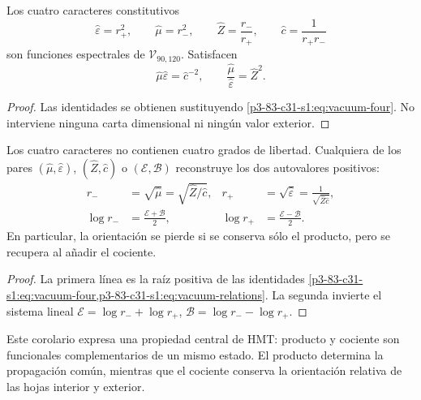 \begin{theorem}
Los cuatro caracteres constitutivos
\begin{equation}
\widehat\varepsilon=r_+^2,\qquad
\widehat\mu=r_-^2,\qquad
\widehat Z=\frac{r_-}{r_+},\qquad
\widehat c=\frac1{r_+r_-}
\label{p3-83-c31-s1:eq:vacuum-four}
\end{equation}
son funciones espectrales de \(\mathcal V_{90,120}\). Satisfacen
\begin{equation}
\widehat\mu\widehat\varepsilon=\widehat c^{-2},
\qquad
\frac{\widehat\mu}{\widehat\varepsilon}=\widehat Z^2.
\label{p3-83-c31-s1:eq:vacuum-relations}
\end{equation}
\end{theorem}

\begin{proof}
Las identidades se obtienen sustituyendo \cref{p3-83-c31-s1:eq:vacuum-four}. No interviene ninguna carta dimensional ni ning\'un valor exterior.
\end{proof}

\begin{corollary}
Los cuatro caracteres no contienen cuatro grados de libertad. Cualquiera de
los pares \((\widehat\mu,\widehat\varepsilon)\),
\((\widehat Z,\widehat c)\) o \((\mathcal E,\mathcal B)\) reconstruye los
dos autovalores positivos:
\begin{align}
r_-&=\sqrt{\widehat\mu}
=\sqrt{\widehat Z/\widehat c},
&r_+&=\sqrt{\widehat\varepsilon}
=\frac1{\sqrt{\widehat Z\widehat c}},
\label{p3-83-c31-s1:eq:vacuum-reconstruct-r}\\
\log r_-&=\frac{\mathcal E+\mathcal B}{2},
&\log r_+&=\frac{\mathcal E-\mathcal B}{2}.
\label{p3-83-c31-s1:eq:vacuum-reconstruct-log}
\end{align}
En particular, la orientaci\'on se pierde si se conserva s\'olo el producto,
pero se recupera al a\~nadir el cociente.
\end{corollary}

\begin{proof}
La primera l\'inea es la ra\'iz positiva de las identidades
\cref{p3-83-c31-s1:eq:vacuum-four,p3-83-c31-s1:eq:vacuum-relations}. La segunda invierte el sistema
lineal
\(\mathcal E=\log r_-+\log r_+\),
\(\mathcal B=\log r_--\log r_+\).
\end{proof}

Este corolario expresa una propiedad central de HMT: producto y cociente son
funcionales complementarios de un mismo estado. El producto determina la
propagaci\'on com\'un, mientras que el cociente conserva la orientaci\'on
relativa de las hojas interior y exterior.

